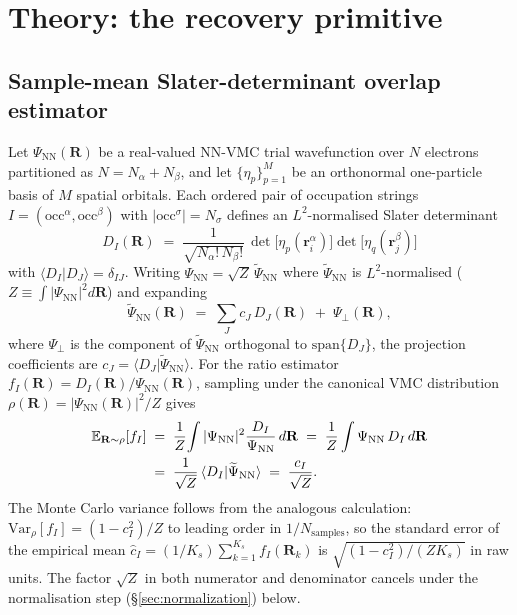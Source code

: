 \documentclass[journal=jctcce,manuscript=article,layout=traditional]{achemso}
\begin{document}
\section{Theory: the recovery primitive}
\label{sec:theory}

\subsection{Sample-mean Slater-determinant overlap estimator}

Let $\Psi_{\mathrm{NN}}(\mathbf{R})$ be a real-valued
NN-VMC trial wavefunction over $N$ electrons partitioned as
$N = N_{\alpha} + N_{\beta}$, and let $\{\eta_p\}_{p=1}^{M}$ be an
orthonormal one-particle basis of $M$ spatial orbitals. Each
ordered pair of occupation strings
$I = (\mathrm{occ}^{\alpha}, \mathrm{occ}^{\beta})$ with
$|\mathrm{occ}^{\sigma}| = N_{\sigma}$ defines an
$L^2$-normalised Slater determinant
\begin{equation}
D_I(\mathbf{R}) \;=\; \frac{1}{\sqrt{N_{\alpha}!\,N_{\beta}!}}\,
\det\!\bigl[\eta_{p}(\mathbf{r}_i^{\alpha})\bigr]
\det\!\bigl[\eta_{q}(\mathbf{r}_j^{\beta})\bigr]
\label{eq:D_I_def}
\end{equation}
with $\langle D_I | D_J \rangle = \delta_{IJ}$. Writing
$\Psi_{\mathrm{NN}} = \sqrt{Z}\,\widetilde{\Psi}_{\mathrm{NN}}$ where
$\widetilde{\Psi}_{\mathrm{NN}}$ is $L^2$-normalised
($Z \equiv \int |\Psi_{\mathrm{NN}}|^2 d\mathbf{R}$) and expanding
\begin{equation}
\widetilde{\Psi}_{\mathrm{NN}}(\mathbf{R})
  \;=\; \sum_J c_J\, D_J(\mathbf{R}) \;+\; \Psi_{\perp}(\mathbf{R}),
\end{equation}
where $\Psi_{\perp}$ is the component of $\widetilde{\Psi}_{\mathrm{NN}}$
orthogonal to $\mathrm{span}\{D_J\}$, the projection coefficients are
$c_J = \langle D_J | \widetilde{\Psi}_{\mathrm{NN}} \rangle$. For the
ratio estimator
$f_I(\mathbf{R}) = D_I(\mathbf{R}) / \Psi_{\mathrm{NN}}(\mathbf{R})$,
sampling under the canonical VMC distribution
$\rho(\mathbf{R}) = |\Psi_{\mathrm{NN}}(\mathbf{R})|^2 / Z$ gives
\begin{align}
\mathbb{E}_{\mathbf{R} \sim \rho}\!\left[ f_I \right]
&\;=\; \frac{1}{Z}\!\int |\Psi_{\mathrm{NN}}|^2
       \frac{D_I}{\Psi_{\mathrm{NN}}}\,d\mathbf{R}
       \;=\; \frac{1}{Z} \int \Psi_{\mathrm{NN}}\,D_I\,d\mathbf{R} \notag \\
&\;=\; \frac{1}{\sqrt{Z}}\,\langle D_I | \widetilde{\Psi}_{\mathrm{NN}} \rangle
       \;=\; \frac{c_I}{\sqrt{Z}}.
\label{eq:f_I_expectation}
\end{align}
The Monte Carlo variance follows from the analogous calculation:
$\mathrm{Var}_{\rho}[f_I] = (1 - c_I^2) / Z$ to leading order in
$1/N_{\text{samples}}$, so the standard error of the empirical mean
$\widehat{c}_I = (1/K_s) \sum_{k=1}^{K_s} f_I(\mathbf{R}_k)$ is
$\sqrt{(1 - c_I^2)/(Z K_s)}$ in raw units. The factor $\sqrt{Z}$ in
both numerator and denominator cancels under the normalisation step
(\S\ref{sec:normalization}) below.
\end{document}
